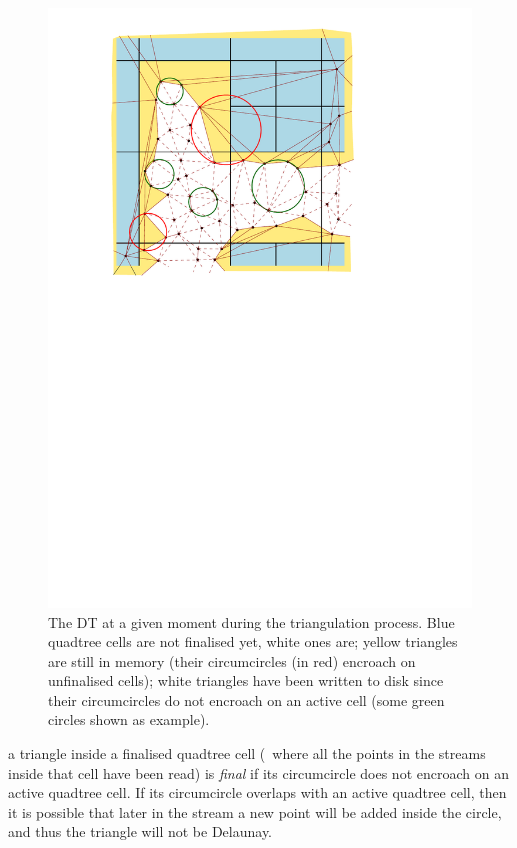 \begin{figure}
  \centering
  \includegraphics[width=\linewidth]{figs/triangulator}
  \caption{The DT at a given moment during the triangulation process. Blue quadtree cells are not finalised yet, white ones are; yellow triangles are still in memory (their circumcircles (in red) encroach on unfinalised cells); white triangles have been written to disk since their circumcircles do not encroach on an active cell (some green circles shown as example).}%
\label{fig:triangulator}
\end{figure}
a triangle inside a finalised quadtree cell (\ie\ where all the points in the streams inside that cell have been read) is \emph{final}%
if its circumcircle does not encroach on an active quadtree cell.
If its circumcircle overlaps with an active quadtree cell, then it is possible that later in the stream a new point will be added inside the circle, and thus the triangle will not be Delaunay.

